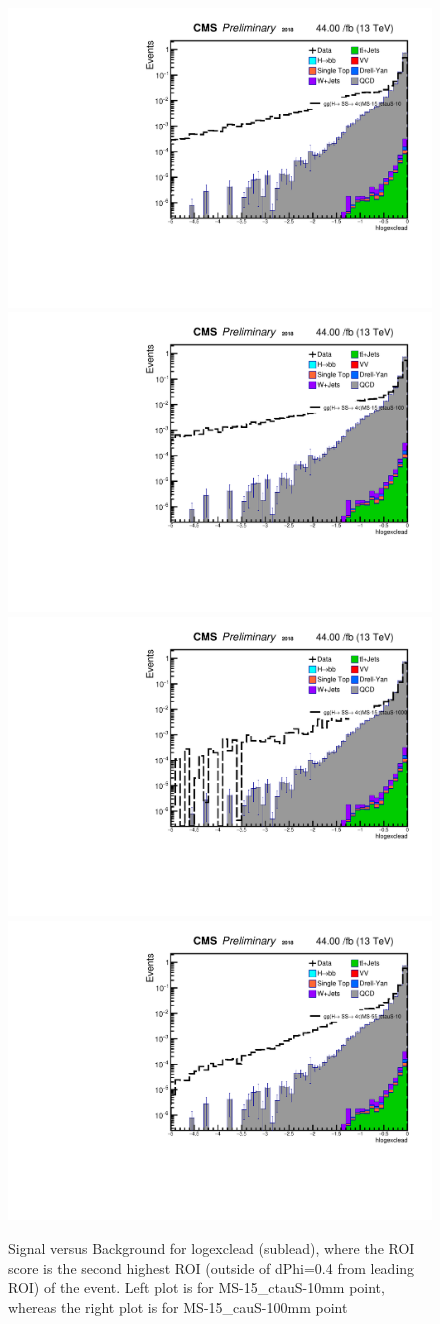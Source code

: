  \begin{figure}[h!]
   \label{fig:excROIscore}
   \centering
   \includegraphics[width=0.47\linewidth]{figs/log_Oct6ANVars_MS-15_ctauS-10_hlogexclead.pdf}
   \includegraphics[width=0.47\linewidth]{figs/log_Oct6ANVars_MS-15_ctauS-100_hlogexclead.pdf}
   \includegraphics[width=0.47\linewidth]{figs/log_Oct6ANVars_MS-15_ctauS-1000_hlogexclead.pdf}
   \includegraphics[width=0.47\linewidth]{figs/log_Oct6ANVars_MS-55_ctauS-10_hlogexclead.pdf}
	 \caption{Signal versus Background for logexclead (sublead), where the ROI score is the second highest ROI (outside of dPhi=0.4 from leading ROI) of the event. Left plot is for MS-15\_ctauS-10mm point, whereas the right plot is for MS-15\_cauS-100mm point}
 \end{figure}

